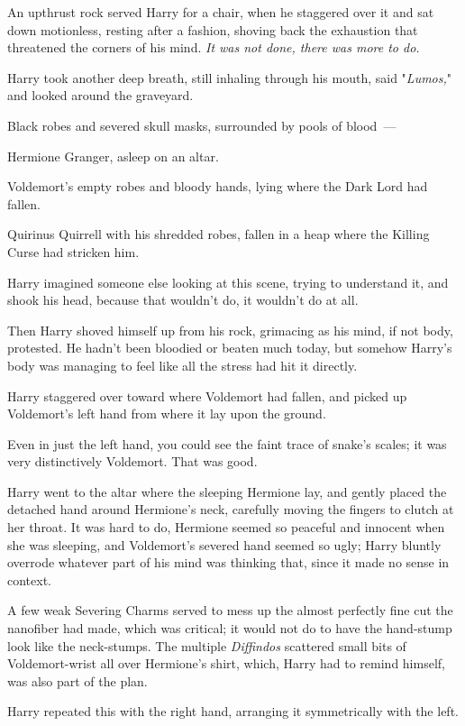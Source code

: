 An upthrust rock served Harry for a chair, when he staggered over it and sat
down motionless, resting after a fashion, shoving back the exhaustion that
threatened the corners of his mind. \emph{It was not done, there was more to
do.}

Harry took another deep breath, still inhaling through his mouth, said
"\emph{Lumos,}" and looked around the graveyard.

Black robes and severed skull masks, surrounded by pools of blood~---

Hermione Granger, asleep on an altar.

Voldemort's empty robes and bloody hands, lying where the Dark Lord had fallen.

Quirinus Quirrell with his shredded robes, fallen in a heap where the Killing
Curse had stricken him.

Harry imagined someone else looking at this scene, trying to understand it, and
shook his head, because that wouldn't do, it wouldn't do at all.

Then Harry shoved himself up from his rock, grimacing as his mind, if not body,
protested. He hadn't been bloodied or beaten much today, but somehow Harry's
body was managing to feel like all the stress had hit it directly.

Harry staggered over toward where Voldemort had fallen, and picked up
Voldemort's left hand from where it lay upon the ground.

Even in just the left hand, you could see the faint trace of snake's scales; it
was very distinctively Voldemort. That was good.

Harry went to the altar where the sleeping Hermione lay, and gently placed the
detached hand around Hermione's neck, carefully moving the fingers to clutch at
her throat. It was hard to do, Hermione seemed so peaceful and innocent when
she was sleeping, and Voldemort's severed hand seemed so ugly; Harry bluntly
overrode whatever part of his mind was thinking that, since it made no sense in
context.

A few weak Severing Charms served to mess up the almost perfectly fine cut the
nanofiber had made, which was critical; it would not do to have the hand-stump
look like the neck-stumps. The multiple \emph{Diffindos} scattered small bits
of Voldemort-wrist all over Hermione's shirt, which, Harry had to remind
himself, was also part of the plan.

Harry repeated this with the right hand, arranging it symmetrically with the
left.

